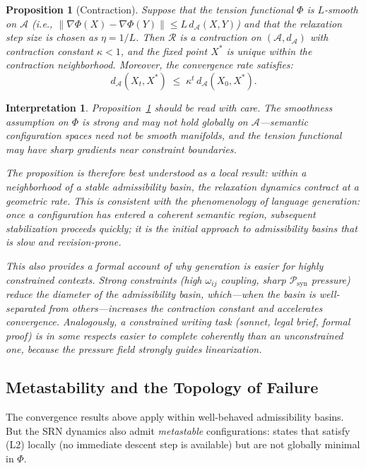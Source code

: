 \documentclass[11pt, a4paper]{article}
\theoremstyle{srn}
\newtheorem{proposition}{Proposition}[section]
\theoremstyle{srnremark}
\newtheorem{interpretation}{Interpretation}[section]
\newcommand{\Aspace}{\mathcal{A}}           %
\newcommand{\Rop}{\mathcal{R}}           %
\newcommand{\Phiten}{\varPhi}            %
\begin{document}
\begin{proposition}[Contraction]
\label{prop:contraction}
Suppose that the tension functional $\Phiten$ is $L$-smooth on
$\Aspace$ (i.e., $\|\nabla\Phiten(X) - \nabla\Phiten(Y)\| \leq
L\,d_{\Aspace}(X,Y)$) and that the relaxation step size is chosen as
$\eta = 1/L$.
Then $\Rop$ is a contraction on $(\Aspace, d_{\Aspace})$ with
contraction constant $\kappa < 1$, and the fixed point $X^*$ is
unique within the contraction neighborhood.
Moreover, the convergence rate satisfies:
\[
  d_{\Aspace}(X_t, X^*)
  \;\leq\;
  \kappa^t\, d_{\Aspace}(X_0, X^*).
\]
\end{proposition}

\begin{interpretation}
Proposition~\ref{prop:contraction} should be read with care.
The smoothness assumption on $\Phiten$ is strong and may not hold
globally on $\Aspace$---semantic configuration spaces need not be
smooth manifolds, and the tension functional may have sharp gradients
near constraint boundaries.

The proposition is therefore best understood as a local result: within
a neighborhood of a stable admissibility basin, the relaxation
dynamics contract at a geometric rate.
This is consistent with the phenomenology of language generation:
once a configuration has entered a coherent semantic region, subsequent
stabilization proceeds quickly; it is the initial approach to
admissibility basins that is slow and revision-prone.

This also provides a formal account of why generation is
\emph{easier} for highly constrained contexts.
Strong constraints (high $\omega_{ij}$ coupling, sharp
$\mathcal{P}_{\mathrm{syn}}$ pressure) reduce the diameter of the
admissibility basin, which---when the basin is well-separated from
others---increases the contraction constant and accelerates convergence.
Analogously, a constrained writing task (sonnet, legal brief, formal
proof) is in some respects easier to complete coherently than an
unconstrained one, because the pressure field strongly guides
linearization.
\end{interpretation}

\subsection{Metastability and the Topology of Failure}

The convergence results above apply within well-behaved admissibility
basins.
But the SRN dynamics also admit \emph{metastable} configurations:
states that satisfy (L2) locally (no immediate descent step is
available) but are not globally minimal in $\Phiten$.
\end{document}
